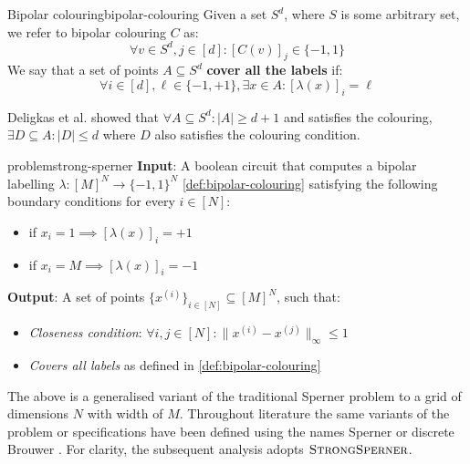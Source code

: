 \begin{definitionbox}{Bipolar colouring}{bipolar-colouring}
    Given a set $S^d$, where $S$ is some arbitrary set, we refer
    to bipolar colouring $C$ as:
    $$
        \forall v \in S^d, j \in [d]: [C(v)]_j \in \{-1,1\}
    $$
    We say that a set of points $A \subseteq S^d$ \textbf{cover all the labels} if:
    $$
        \forall i \in [d], \ell \in \{-1, +1\}, \exists x \in A: [\lambda(x)]_{i} = \ell
    $$

\end{definitionbox}

Deligkas et al. \cite{deligkas_PureCircuitTightInapproximability_2024, deligkas_ConstantInapproximabilityPPA_2022} showed that
$\forall A \subseteq S^d: |A| \geq d+1$ and satisfies the colouring, $\exists D \subseteq A: |D| \leq d$ where $D$ also satisfies
the colouring condition.

\begin{definitionbox}{ problem}{strong-sperner}
    \textbf{Input}: A boolean circuit that computes a bipolar labelling $\lambda: [M]^N \to \{-1, 1\}^N$ \ref{def:bipolar-colouring}
    satisfying the following boundary conditions for every $i \in [N]$:
    \begin{itemize}
        \item if $x_i = 1 \implies [\lambda(x)]_i = +1$
        \item if $x_i = M \implies [\lambda(x)]_i = -1$
    \end{itemize}
    \textbf{Output}: A set of points $\{x^{(i)}\}_{i \in [N]} \subseteq [M]^{N}$, such that:
    \begin{itemize}
        \item \textit{Closeness condition}: $\forall i,j \in [N]: \|x^{(i)} - x^{(j)}\|_{\infty} \leq 1$
        \item \textit{Covers all labels} as defined in \ref{def:bipolar-colouring}
    \end{itemize}
\end{definitionbox}

 
The above is a generalised variant of the traditional Sperner problem to
a grid of dimensions $N$ with width of $M$.
Throughout literature the same variants of the problem or specifications
have been defined using the names Sperner or discrete Brouwer \cite{chen_SettlingComplexityComputing_2009, chen_Complexity2DDiscrete_2009, daskalakis_ComplexityComputingNash_2006, deligkas_PureCircuitTightInapproximability_2024}.
For clarity, the subsequent analysis adopts $\textsc{StrongSperner}$.

